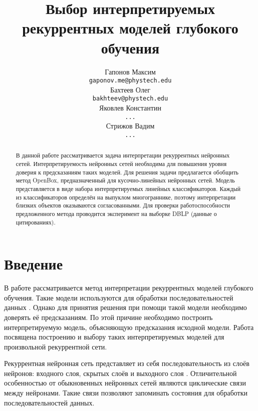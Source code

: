\documentclass[12pt]{article}
\begin{document}
\title
{Выбор интерпретируемых рекуррентных моделей глубокого обучения}
\author{Гапонов Максим \\
	\texttt{gaponov.me@phystech.edu} \\
	\And
	Бахтеев Олег \\
	\texttt{bakhteev@phystech.edu} \\
	\And
	Яковлев Константин \\
	\texttt{...} \\
	\And
	Стрижов Вадим \\
	\texttt{...} \\
}
\date{}
\maketitle
\begin{abstract}
В данной работе рассматривается задача интерпретации рекуррентных нейронных сетей. Интерпретируемость нейронных сетей необходима для повышения уровня доверия к предсказаниям таких моделей. Для решения задачи предлагается обобщить метод OpenBox, предназначенный для кусочно-линейных нейронных сетей. Модель представляется в виде набора интерпретируемых линейных классификаторов. Каждый из классификаторов определён на выпуклом многограннике, поэтому интерпретации близких объектов оказываются согласованными. Для проверки работоспособности предложенного метода проводится эксперимент на выборке DBLP (данные о цитированиях).
\end{abstract}

\section{Введение}
В работе рассматривается метод интерпретации рекуррентных моделей глубокого обучения. Такие модели используются для обработки последовательностей данных \cite{lipton2015critical}. Однако для принятия решения при помощи такой модели необходимо доверять её предсказаниям. По этой причине необходимо построить интерпретируемую модель, объясняющую предсказания исходной модели. Работа посвящена построению и выбору таких интерпретируемых моделей для произвольной рекуррентной сети.

Рекуррентная нейронная сеть представляет из себя последовательность из слоёв нейронов: входного слоя, скрытых слоёв и выходного слоя \cite{sherstinsky2020fundrnn}. Отличительной особенностью от обыкновенных нейронных сетей являются циклические связи между нейронами. Такие связи позволяют запоминать состояния для обработки последовательностей данных.
\end{document}
